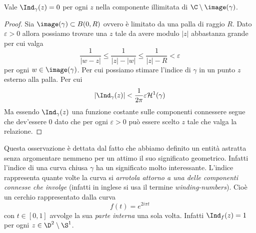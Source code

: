 \begin{corollary}
  Vale $\Ind_\gamma(z) = 0$ per ogni $z$ nella componente
  illimitata di $\C \setminus \image(\gamma)$.  
  \label{cor:index-is-trivial-in-illimited-connex-component}
\end{corollary}
\begin{proof}
  Sia $\image(\gamma) \subset B(0, R)$ ovvero è limitato da una palla di
  raggio $R$. Dato $\varepsilon > 0$ allora possiamo trovare una $z$ tale da
  avere modulo $|z|$ abbastanza grande per cui valga
  \begin{equation*}
    \frac{1}{|w-z|} \le \frac{1}{|z| - |w|} \le \frac{1}{|z| - R}
    < \varepsilon
  \end{equation*}
  per ogni $w \in \image(\gamma)$. Per cui possiamo stimare l'indice di
  $\gamma$ in un punto $z$ esterno alla palla. Per cui
  \begin{equation*}
    |\Ind_\gamma(z)| < \frac{1}{2\pi} \varepsilon
    \mathcal{H}^1(\gamma)
  \end{equation*}
  Ma essendo $\Ind_\gamma(z)$ una funzione costante sulle
  componenti connessere segue che dev'essere $0$ dato che per ogni
  $\varepsilon > 0$ può essere scelto $z$ tale che valga la relazione.
\end{proof}

\begin{remark}
    Questa osservazione è dettata dal fatto che abbiamo definito un entità
    astratta senza argomentare nemmeno per un attimo il suo significato
    geometrico. Infatti l'indice di una curva chiusa $\gamma$ ha un significato
    molto interessante. L'indice rappresenta quante volte la curva si
    \textit{arrotola attorno a una delle componenti connesse che involge} (infatti
    in inglese si usa il termine \textit{winding-numbers}). Cioè un
    cerchio rappresentato dalla curva 
    \begin{equation*}
        f(t) = e^{2i\pi t}
    \end{equation*}
    con $t \in \left[0, 1 \right]$ avvolge la sua \textit{parte interna} una sola
    volta. Infatti $\Ind_f(z) = 1$ per ogni $z \in \D^2 
    \setminus \S^1$.
    \label{rmk:winding-numbers-interpretation}
\end{remark}

